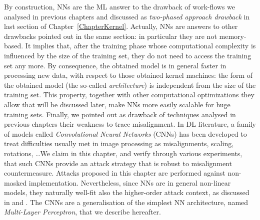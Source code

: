 By construction, NNs are the ML answer to the drawback of work-flows we analysed in previous chapters and discussed as \emph{two-phased approach drawback} in last section of Chapter~\ref{ChapterKernel}. Actually, NNs are answers to other drawbacks pointed out in the same section: in particular they are not memory-based. It implies that, after the training phase whose computational complexity is influenced by the size of the training set, they do not need to access the training set any more. By consequence, the obtained model is in general faster in processing new data, with respect to those obtained \via kernel machines: the form of the obtained model (\ie the so-called \emph{architecture}) is independent from the size of the training set. This property, together with other computational optimizations they allow that will be discussed later, make NNs more easily scalable for huge training sets. Finally, we pointed out as drawback of techniques analysed in previous chapters their weakness to trace misalignment. In DL literature, a family of models called \emph{Convolutional Neural Networks} (CNNs) has been developed to treat difficulties usually met in image processing as misalignments, scaling, rotations, \dots We claim in this chapter, and verify through various experiments, that such CNNs provide an attack strategy that is robust to misalignment countermeasure. Attacks proposed in this chapter are performed against non-masked implementation. Nevertheless, since NNs are in general non-linear models, they naturally well-fit also the higher-order attack context, as discussed in \cite{maghrebi2016breaking} and \cite{DLwhitepaper}. The CNNs are a generalisation of the simplest NN architecture, named \emph{Multi-Layer Perceptron}, that we describe hereafter. 


